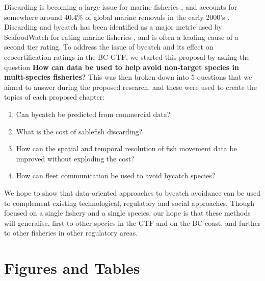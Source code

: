 \documentclass{article}
\begin{document}
Discarding is becoming a large issue for marine fisheries \citep{kelleher2005discards}, and accounts for somewhere around 40.4\% of global marine removals in the early 2000's \citep{davies2009defining}. Discarding and bycatch has been identified as a major metric used by SeafoodWatch for rating marine fisheries \citep{Pelc201556}, and is often a leading cause of a second tier rating. To address the issue of bycatch and its effect on ecocertification ratings in the BC GTF, we started this proposal by asking the question {\bf How can data be used to help avoid non-target species in multi-species fisheries?} This was then broken down into 5 questions that we aimed to answer during the proposed research, and these were used to create the topics of each proposed chapter:
\begin{enumerate}
  \item Can bycatch be predicted from commercial data?
  \item What is the cost of sablefish discarding?
  \item How can the spatial and temporal resolution of fish movement data be improved without exploding the cost?
  \item How can fleet communication be used to avoid bycatch species?
\end{enumerate}

We hope to show that data-oriented approaches to bycatch avoidance can be used to complement existing technological, regulatory and social approaches. Though focused on a single fishery and a single species, our hope is that these methods will generalise, first to other species in the GTF and on the BC coast, and further to other fisheries in other regulatory areas.





\newpage

\section*{Figures and Tables}
\end{document}
